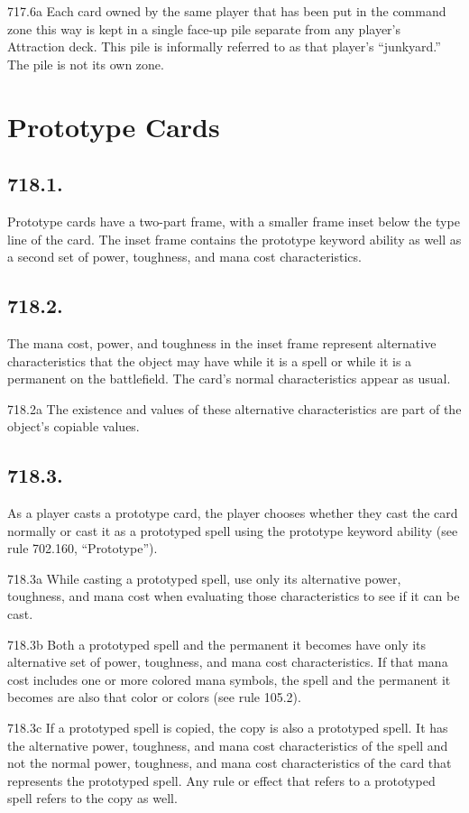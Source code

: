 717.6a Each card owned by the same player that has been put in the command zone this way is kept in a single face-up pile separate from any player’s Attraction deck. This pile is informally referred to as that player’s “junkyard.” The pile is not its own zone.

\section{Prototype Cards}
\subsection*{718.1.}
Prototype cards have a two-part frame, with a smaller frame inset below the type line of the card. The inset frame contains the prototype keyword ability as well as a second set of power, toughness, and mana cost characteristics.

\subsection*{718.2.}
The mana cost, power, and toughness in the inset frame represent alternative characteristics that the object may have while it is a spell or while it is a permanent on the battlefield. The card’s normal characteristics appear as usual.

718.2a The existence and values of these alternative characteristics are part of the object’s copiable values.

\subsection*{718.3.}
As a player casts a prototype card, the player chooses whether they cast the card normally or cast it as a prototyped spell using the prototype keyword ability (see rule 702.160, “Prototype”).

718.3a While casting a prototyped spell, use only its alternative power, toughness, and mana cost when evaluating those characteristics to see if it can be cast.

718.3b Both a prototyped spell and the permanent it becomes have only its alternative set of power, toughness, and mana cost characteristics. If that mana cost includes one or more colored mana symbols, the spell and the permanent it becomes are also that color or colors (see rule 105.2).

718.3c If a prototyped spell is copied, the copy is also a prototyped spell. It has the alternative power, toughness, and mana cost characteristics of the spell and not the normal power, toughness, and mana cost characteristics of the card that represents the prototyped spell. Any rule or effect that refers to a prototyped spell refers to the copy as well.

